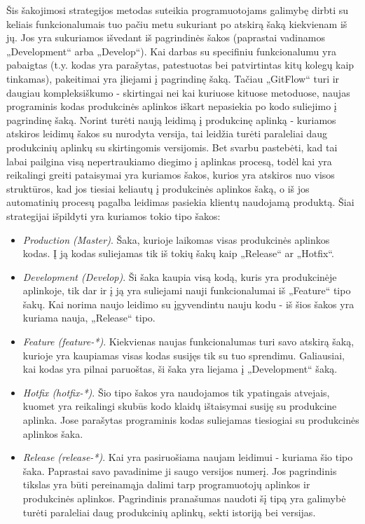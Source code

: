 \documentclass{VUMIFPSkursinis}
\begin{document}

Šis šakojimosi strategijos metodas suteikia programuotojams galimybę dirbti su keliais funkcionalumais tuo pačiu metu sukuriant po atskirą šaką kiekvienam iš jų. Jos yra sukuriamos išvedant iš pagrindinės šakos (paprastai vadinamos „Development“ arba „Develop“). Kai darbas su specifiniu funkcionalumu yra pabaigtas (t.y. kodas yra parašytas, patestuotas bei patvirtintas kitų kolegų kaip tinkamas), pakeitimai yra įliejami į pagrindinę šaką. Tačiau „GitFlow“ turi ir daugiau kompleksiškumo - skirtingai nei kai kuriuose kituose metoduose, naujas programinis kodas produkcinės aplinkos iškart nepasiekia po kodo suliejimo į pagrindinę šaką. Norint turėti naują leidimą į produkcinę aplinką - kuriamos atskiros leidimų šakos su nurodyta versija, tai leidžia turėti paraleliai daug produkcinių aplinkų su skirtingomis versijomis. Bet svarbu pastebėti, kad tai labai pailgina visą nepertraukiamo diegimo į aplinkas procesą, todėl kai yra reikalingi greiti pataisymai yra kuriamos šakos, kurios yra atskiros nuo visos struktūros, kad jos tiesiai keliautų į produkcinės aplinkos šaką, o iš jos automatinių procesų pagalba leidimas pasiekia klientų naudojamą produktą. Šiai strategijai išpildyti yra kuriamos tokio tipo šakos:

\begin{itemize}
  \item \textit{Production (Master)}. Šaka, kurioje laikomas visas produkcinės aplinkos kodas. Į ją kodas suliejamas tik iš tokių šakų kaip „Release“ ar „Hotfix“.
  
  \item \textit{Development (Develop)}. Ši šaka kaupia visą kodą, kuris yra produkcinėje aplinkoje, tik dar ir į ją yra suliejami nauji funkcionalumai iš „Feature“ tipo šakų. Kai norima naujo leidimo su įgyvendintu nauju kodu - iš šios šakos yra kuriama nauja, „Release“ tipo.

  \item \textit{Feature (feature-*)}. Kiekvienas naujas funkcionalumas turi savo atskirą šaką, kurioje yra kaupiamas visas kodas susijęs tik su tuo sprendimu. Galiausiai, kai kodas yra pilnai paruoštas, ši šaka yra liejama į „Development“ šaką.

  \item \textit{Hotfix (hotfix-*)}. Šio tipo šakos yra naudojamos tik ypatingais atvejais, kuomet yra reikalingi skubūs kodo klaidų ištaisymai susiję su produkcine aplinka. Jose parašytas programinis kodas suliejamas tiesiogiai su produkcinės aplinkos šaka.

  
  \item \textit{Release (release-*)}. Kai yra pasiruošiama naujam leidimui - kuriama šio tipo šaka. Paprastai savo pavadinime ji saugo versijos numerį. Jos pagrindinis tikslas yra būti pereinamąja dalimi tarp programuotojų aplinkos ir produkcinės aplinkos. Pagrindinis pranašumas naudoti šį tipą yra galimybė turėti paraleliai daug produkcinių aplinkų, sekti istoriją bei versijas.
\end{itemize}
\end{document}
